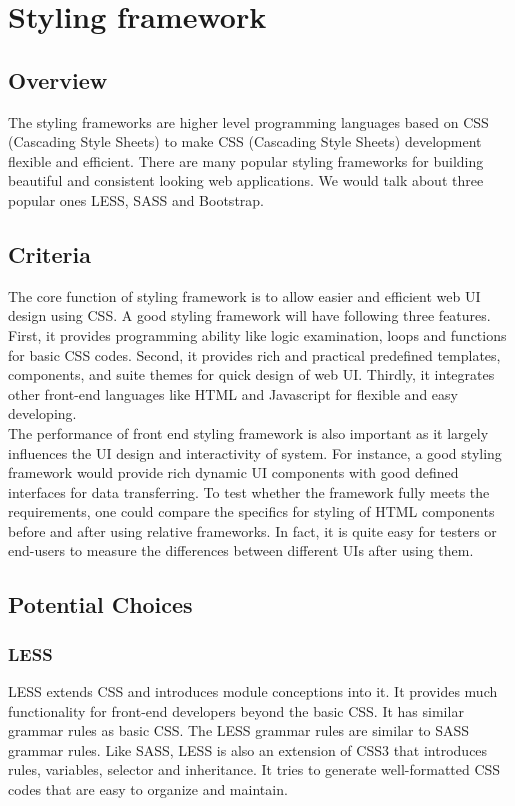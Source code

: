 \documentclass[letterpaper,10pt]{article}
\begin{document}
\section{Styling framework}
	\subsection{Overview}
  The styling frameworks are higher level programming languages based on CSS (Cascading Style Sheets) to make CSS (Cascading Style Sheets) development flexible and efficient. There are many popular styling frameworks for building beautiful and consistent looking web applications. We would talk about three popular ones LESS, SASS and Bootstrap.

	\subsection{Criteria}
  The core function of styling framework is to allow easier and efficient web UI design using CSS. A good styling framework will have following three features. First, it provides programming ability like logic examination, loops and functions for basic CSS codes. Second, it provides rich and practical predefined templates, components, and suite themes for quick design of web UI. Thirdly, it integrates other front-end languages like HTML and Javascript for flexible and easy developing.\\
  The performance of front end styling framework is also important as it largely influences the UI design and interactivity of system. For instance, a good styling framework would provide rich dynamic UI components with good defined interfaces for data transferring. To test whether the framework fully meets the requirements, one could compare the specifics for styling of HTML components before and after using relative frameworks. In fact, it is quite easy for testers or end-users to measure the differences between different UIs after using them.

	\subsection{Potential Choices}
		\subsubsection{LESS}
        LESS extends CSS and introduces module conceptions into it. It provides much functionality for front-end developers beyond the basic CSS. It has similar grammar rules as basic CSS. The LESS grammar rules are similar to SASS grammar rules. Like SASS, LESS is also an extension of CSS3 that introduces rules, variables, selector and inheritance. It tries to generate well-formatted CSS codes that are easy to organize and maintain.
\end{document}
